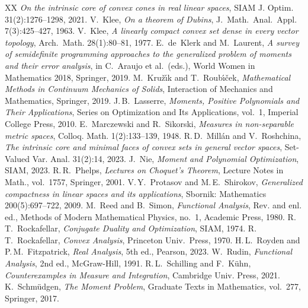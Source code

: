 \documentclass[a4paper,11pt,reqno]{amsart}
\numberwithin{equation}{section}
\theoremstyle{plain}
\theoremstyle{definition}
\begin{document}
\begin{thebibliography}{XX}
\emph{On the intrinsic core of convex cones in real linear spaces},
SIAM J. Optim. 31(2):1276--1298, 2021.
%
V.~Klee, 
\emph{On a theorem of Dubins},
J.~Math.~Anal.~Appl. 7(3):425--427, 1963.
%
V.~Klee,
\emph{A linearly compact convex set dense in every vector topology},
Arch.~Math. 28(1):80--81, 1977.
%
E.~de~Klerk and M.~Laurent, 
\emph{A survey of semidefinite programming approaches to the generalized 
problem of moments and their error analysis}, 
in C.~Araujo et al.\ (eds.),
World Women in Mathematics 2018,
Springer, 2019.
%
M.~Kru\v{z}\'{\i}k and T.~Roub\'{\i}\v{c}ek, 
\emph{Mathematical Methods in Continuum Mechanics of Solids}, 
Interaction of Mechanics and Mathematics, Springer, 2019.
%
J.\,B.~Lasserre,
\emph{Moments, Positive Polynomials and Their Applications}, 
Series on Optimization and Its Applications, vol.~1, 
Imperial College Press, 2010.
%
E.~Marczewski and R.~Sikorski, 
\emph{Measures in non-separable metric spaces},
Colloq. Math. 1(2):133--139, 1948.
%
R.\,D.~Mill{\'a}n and V.~Roshchina, 
\emph{The intrinsic core and minimal faces of convex sets in general vector spaces},
Set-Valued Var. Anal. 31(2):14, 2023.
%
J.~Nie,
\emph{Moment and Polynomial Optimization},
SIAM, 2023.
%
R.\,R.~Phelps,
\emph{Lectures on Choquet's Theorem},
Lecture Notes in Math., vol.~1757, Springer, 2001.
%
V.\,Y.~Protasov and M.\,E.~Shirokov,
\emph{Generalized compactness in linear spaces and its applications},
Sbornik: Mathematics 200(5):697--722, 2009.
%
M.~Reed and B.~Simon,
\emph{Functional Analysis}, 
Rev. and enl. ed., 
Methods of Modern Mathematical Physics, no.~1, 
Academic Press, 1980.
%
R.\,T.~Rockafellar,
\emph{Conjugate Duality and Optimization}, 
SIAM, 1974.
%
R.\,T.~Rockafellar, 
\emph{Convex Analysis},
Princeton Univ.\ Press, 1970.
%
H.\,L.~Royden and P.\,M.~Fitzpatrick, 
\emph{Real Analysis}, 5th ed., 
Pearson, 2023. 
%
W.~Rudin, 
\emph{Functional Analysis}, 2nd ed.,
{McGraw-Hill, 1991}.
%
R.\,L.~Schilling and F.~K{\"u}hn,
\emph{Counterexamples in Measure and Integration},
Cambridge Univ. Press, 2021.
%
K.~Schm{\"u}dgen, 
\emph{The Moment Problem}, 
Graduate Texts in Mathematics, vol.~277, 
Springer, 2017.
%

\end{thebibliography}
\end{document}
